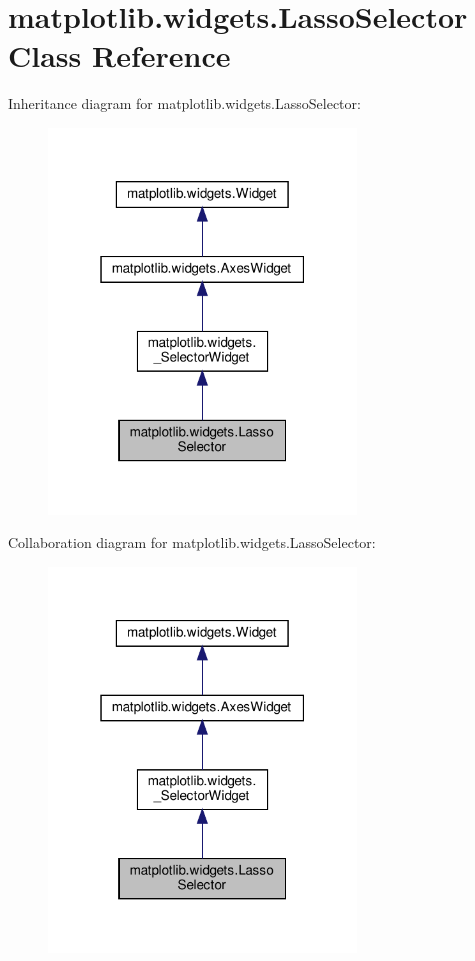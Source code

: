 \hypertarget{classmatplotlib_1_1widgets_1_1LassoSelector}{}\section{matplotlib.\+widgets.\+Lasso\+Selector Class Reference}
\label{classmatplotlib_1_1widgets_1_1LassoSelector}


Inheritance diagram for matplotlib.\+widgets.\+Lasso\+Selector\+:
\nopagebreak
\begin{figure}[H]
\begin{center}
\leavevmode
\includegraphics[width=232pt]{classmatplotlib_1_1widgets_1_1LassoSelector__inherit__graph}
\end{center}
\end{figure}


Collaboration diagram for matplotlib.\+widgets.\+Lasso\+Selector\+:
\nopagebreak
\begin{figure}[H]
\begin{center}
\leavevmode
\includegraphics[width=232pt]{classmatplotlib_1_1widgets_1_1LassoSelector__coll__graph}
\end{center}
\end{figure}
